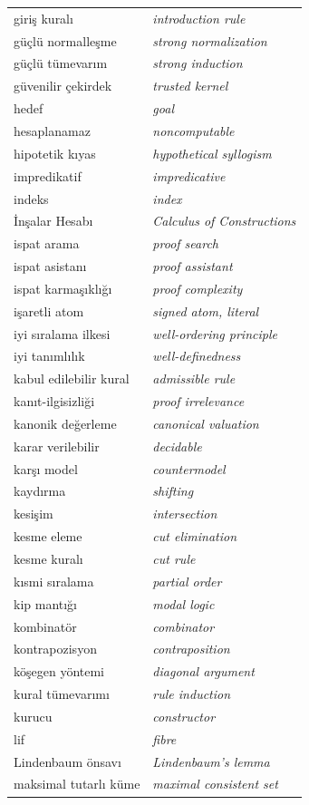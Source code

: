 \begin{center}
\begin{tabularx}{\linewidth}{>{\raggedright\arraybackslash}X >{\raggedright\arraybackslash\itshape}X}
giriş kuralı & introduction rule \\
güçlü normalleşme & strong normalization \\
güçlü tümevarım & strong induction \\
güvenilir çekirdek & trusted kernel \\
hedef & goal \\
hesaplanamaz & noncomputable \\
hipotetik kıyas & hypothetical syllogism \\
impredikatif & impredicative \\
indeks & index \\
İnşalar Hesabı & Calculus of Constructions \\
ispat arama & proof search \\
ispat asistanı & proof assistant \\
ispat karmaşıklığı & proof complexity \\
işaretli atom & signed atom, literal \\
iyi sıralama ilkesi & well-ordering principle \\
iyi tanımlılık & well-definedness \\
kabul edilebilir kural & admissible rule \\
kanıt-ilgisizliği & proof irrelevance \\
kanonik değerleme & canonical valuation \\
karar verilebilir & decidable \\
karşı model & countermodel \\
kaydırma & shifting \\
kesişim & intersection \\
kesme eleme & cut elimination \\
kesme kuralı & cut rule \\
kısmi sıralama & partial order \\
kip mantığı & modal logic \\
kombinatör & combinator \\
kontrapozisyon & contraposition \\
köşegen yöntemi & diagonal argument \\
kural tümevarımı & rule induction \\
kurucu & constructor \\
lif & fibre \\
Lindenbaum önsavı & Lindenbaum's lemma \\
maksimal tutarlı küme & maximal consistent set \\

\end{tabularx}
\end{center}
